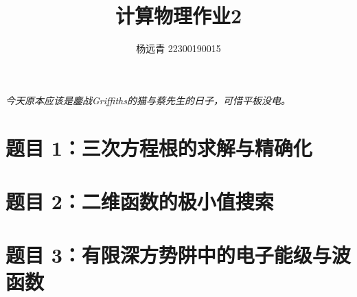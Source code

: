 \documentclass[11pt]{article}
\author{杨远青 22300190015}
\title{计算物理作业2}
\begin{document}
\maketitle
\textit{今天原本应该是鏖战Griffiths的猫与蔡先生的日子，可惜平板没电。}
\section{题目 1：三次方程根的求解与精确化}


\section{题目 2：二维函数的极小值搜索}


\section{题目 3：有限深方势阱中的电子能级与波函数}


\vspace{5pt}
\end{document}

